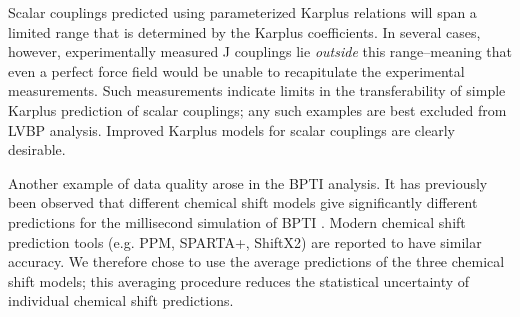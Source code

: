 \documentclass[journal=jacsat,manuscript=article]{achemso}
\begin{document}
Scalar couplings predicted using parameterized Karplus relations will span a limited range that is determined by the Karplus coefficients.  In several cases, however, experimentally measured J couplings lie \emph{outside} this range--meaning that even a perfect force field would be unable to recapitulate the experimental measurements.  Such measurements indicate limits in the transferability of simple Karplus prediction of scalar couplings; any such examples are best excluded from LVBP analysis.  Improved  Karplus models for scalar couplings are clearly desirable.  

Another example of data quality arose in the BPTI analysis.  It has previously been observed that different chemical shift models give significantly different predictions for the millisecond simulation of BPTI \cite{xue2012microsecond}.  Modern chemical shift prediction tools (e.g. PPM, SPARTA+, ShiftX2) are reported to have similar accuracy.  We therefore chose to use the average predictions of the three chemical shift models; this averaging procedure reduces the statistical uncertainty of individual chemical shift predictions.  



\end{document}
